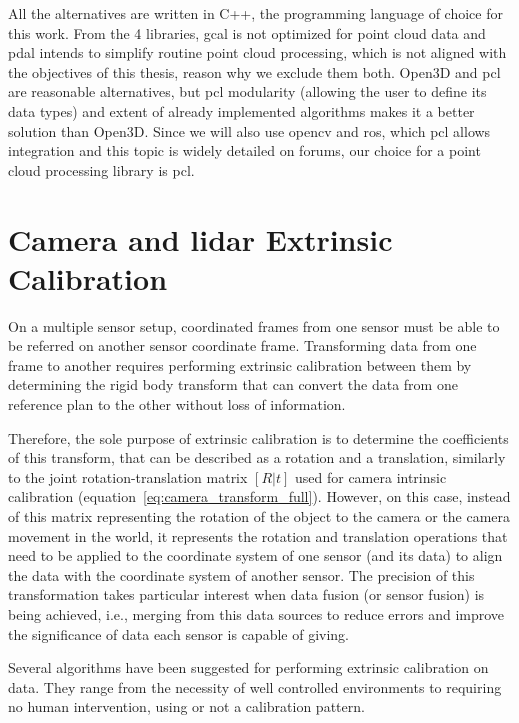 All the alternatives are written in C++, the programming language of choice for this work. From the 4 libraries, \ac{gcal} is not optimized for point cloud data and \ac{pdal} intends to simplify routine point cloud processing, which is not aligned with the objectives of this thesis, reason why we exclude them both. Open3D and \ac{pcl} are reasonable alternatives, but \ac{pcl} modularity (allowing the user to define its data types) and extent of already implemented algorithms makes it a better solution than Open3D. Since we will also use \ac{opencv} and \ac{ros}, which \ac{pcl} allows integration and this topic is widely detailed on forums, our choice for a point cloud processing library is \ac{pcl}.

\section{Camera and \ac{lidar} Extrinsic Calibration}
\label{sec:sota:extrinsic_calibration}

On a multiple sensor setup, coordinated frames from one sensor must be able to be referred on another sensor coordinate frame. Transforming data from one frame to another requires performing extrinsic calibration between them by determining the rigid body transform that can convert the data from one reference plan to the other without loss of information.

Therefore, the sole purpose of extrinsic calibration is to determine the coefficients of this transform, that can be described as a rotation and a translation, similarly to the joint rotation-translation matrix $[R|t]$ used for camera intrinsic calibration (equation~\ref{eq:camera_transform_full}). However, on this case, instead of this matrix representing the rotation of the object to the camera or the camera movement in the world, it represents the rotation and translation operations that need to be applied to the coordinate system of one sensor (and its data) to align the data with the coordinate system of another sensor. The precision of this transformation takes particular interest when data fusion (or sensor fusion) is being achieved, i.e., merging from this data sources to reduce errors and improve the significance of data each sensor is capable of giving. 

Several algorithms have been suggested for performing extrinsic calibration on data. They range from the necessity of well controlled environments to requiring no human intervention, using or not a calibration pattern. 



